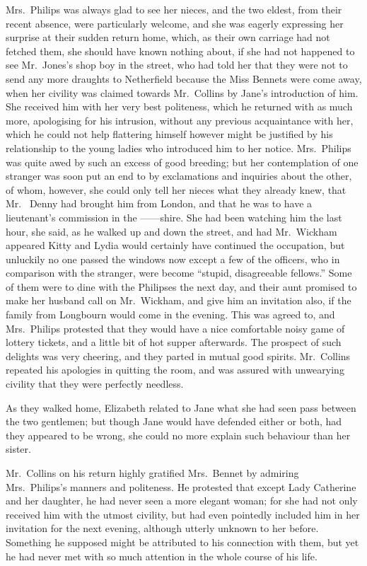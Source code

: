 Mrs.\ Philips was always glad to see her nieces, and the
two eldest, from their recent absence, were particularly
welcome, and she was eagerly expressing her surprise at
their sudden return home, which, as their own carriage
had not fetched them, she should have known nothing
about, if she had not happened to see Mr.\ Jones’s shop boy
in the street, who had told her that they were not to send
any more draughts to Netherfield because the Miss
Bennets were come away, when her civility was claimed
towards Mr.\ Collins by Jane’s introduction of him. She
received him with her very best politeness, which he
returned with as much more, apologising for his intrusion,
without any previous acquaintance with her, which he
could not help flattering himself however might be justified
by his relationship to the young ladies who introduced
him to her notice. Mrs.\ Philips was quite awed by such
an excess of good breeding; but her contemplation of
one stranger was soon put an end to by exclamations and
inquiries about the other, of whom, however, she could
only tell her nieces what they already knew, that Mr.\ %
Denny had brought him from London, and that he was
to have a lieutenant’s commission in the ------shire. She
had been watching him the last hour, she said, as he walked
up and down the street, and had Mr.\ Wickham appeared
Kitty and Lydia would certainly have continued the
occupation, but unluckily no one passed the windows
now except a few of the officers, who in comparison with
the stranger, were become “stupid, disagreeable fellows.”
Some of them were to dine with the Philipses the next
day, and their aunt promised to make her husband call
on Mr.\ Wickham, and give him an invitation also, if the
family from Longbourn would come in the evening. This
was agreed to, and Mrs.\ Philips protested that they would
have a nice comfortable noisy game of lottery tickets, and
a little bit of hot supper afterwards. The prospect of
such delights was very cheering, and they parted in mutual
good spirits. Mr.\ Collins repeated his apologies in quitting
the room, and was assured with unwearying civility that
they were perfectly needless.

As they walked home, Elizabeth related to Jane what
she had seen pass between the two gentlemen; but though
Jane would have defended either or both, had they
appeared to be wrong, she could no more explain such
behaviour than her sister.

Mr.\ Collins on his return highly gratified Mrs.\ Bennet
by admiring Mrs.\ Philips’s manners and politeness. He
protested that except Lady Catherine and her daughter,
he had never seen a more elegant woman; for she had
not only received him with the utmost civility, but had
even pointedly included him in her invitation for the next
evening, although utterly unknown to her before. Something
he supposed might be attributed to his connection
with them, but yet he had never met with so much
attention in the whole course of his life.

